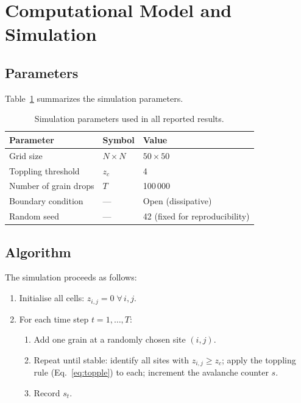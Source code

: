 \documentclass[12pt,a4paper]{article}
\begin{document}
\section{Computational Model and Simulation}
\label{sec:model}

\subsection{Parameters}

Table~\ref{tab:params} summarizes the simulation parameters.

\begin{table}[H]
\centering
\caption{Simulation parameters used in all reported results.}
\label{tab:params}
\begin{tabular}{lll}
\toprule
\textbf{Parameter} & \textbf{Symbol} & \textbf{Value} \\
\midrule
Grid size            & $N\times N$   & $50\times50$   \\
Toppling threshold   & $z_c$         & 4              \\
Number of grain drops & $T$          & 100\,000       \\
Boundary condition   & ---           & Open (dissipative) \\
Random seed          & ---           & 42 (fixed for reproducibility) \\
\bottomrule
\end{tabular}
\end{table}

\subsection{Algorithm}

The simulation proceeds as follows:

\begin{enumerate}[noitemsep]
  \item Initialise all cells: $z_{i,j} = 0 \;\forall\, i,j$.
  \item For each time step $t = 1, \ldots, T$:
  \begin{enumerate}[noitemsep, label=\alph*.]
    \item Add one grain at a randomly chosen site $(i,j)$.
    \item Repeat until stable: identify all sites with $z_{i,j}\geq z_c$;
          apply the toppling rule (Eq.~\ref{eq:topple}) to each; increment
          the avalanche counter $s$.
    \item Record $s_t$.
  \end{enumerate}
\end{enumerate}
\end{document}
